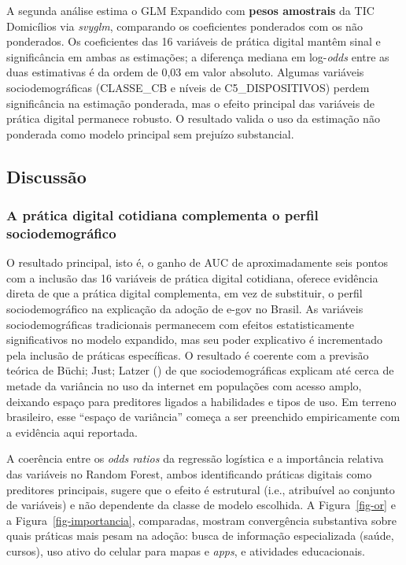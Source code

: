 \documentclass[
  man,
  floatsintext,
  longtable,
  a4paper,
  nolmodern,
  notxfonts,
  notimes,
  colorlinks=true,linkcolor=blue,citecolor=blue,urlcolor=blue]{apa7}
\begin{document}
A segunda análise estima o GLM Expandido com \textbf{pesos amostrais} da
TIC Domicílios via \emph{svyglm}, comparando os coeficientes ponderados
com os não ponderados. Os coeficientes das 16 variáveis de prática
digital mantêm sinal e significância em ambas as estimações; a diferença
mediana em log-\emph{odds} entre as duas estimativas é da ordem de 0,03
em valor absoluto. Algumas variáveis sociodemográficas (CLASSE\_CB e
níveis de C5\_DISPOSITIVOS) perdem significância na estimação ponderada,
mas o efeito principal das variáveis de prática digital permanece
robusto. O resultado valida o uso da estimação não ponderada como modelo
principal sem prejuízo substancial.

\subsection{Discussão}\label{discussuxe3o}

\subsubsection{A prática digital cotidiana complementa o perfil
sociodemográfico}\label{a-pruxe1tica-digital-cotidiana-complementa-o-perfil-sociodemogruxe1fico}

O resultado principal, isto é, o ganho de AUC de aproximadamente seis
pontos com a inclusão das 16 variáveis de prática digital cotidiana,
oferece evidência direta de que a prática digital complementa, em vez de
substituir, o perfil sociodemográfico na explicação da adoção de e-gov
no Brasil. As variáveis sociodemográficas tradicionais permanecem com
efeitos estatisticamente significativos no modelo expandido, mas seu
poder explicativo é incrementado pela inclusão de práticas específicas.
O resultado é coerente com a previsão teórica de Büchi; Just; Latzer
() de que sociodemográficas
explicam até cerca de metade da variância no uso da internet em
populações com acesso amplo, deixando espaço para preditores ligados a
habilidades e tipos de uso. Em terreno brasileiro, esse ``espaço de
variância'' começa a ser preenchido empiricamente com a evidência aqui
reportada.

A coerência entre os \emph{odds ratios} da regressão logística e a
importância relativa das variáveis no Random Forest, ambos identificando
práticas digitais como preditores principais, sugere que o efeito é
estrutural (i.e., atribuível ao conjunto de variáveis) e não dependente
da classe de modelo escolhida. A Figura~\ref{fig-or} e a
Figura~\ref{fig-importancia}, comparadas, mostram convergência
substantiva sobre quais práticas mais pesam na adoção: busca de
informação especializada (saúde, cursos), uso ativo do celular para
mapas e \emph{apps}, e atividades educacionais.
\end{document}
